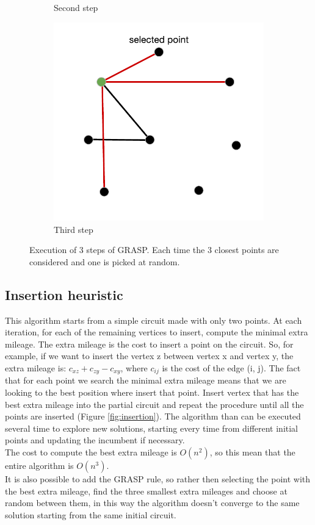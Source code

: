 \begin{figure}[h!]
\begin{subfigure}[b]{0.49\linewidth}
    \caption{Second step}
  \end{subfigure}
  \begin{subfigure}[b]{0.49\linewidth}
    \includegraphics[width=\linewidth]{media/grasp_fase3.pdf}
    \caption{Third step}
  \end{subfigure}
  \caption{Execution of 3 steps of GRASP. Each time the 3 closest points are considered and one is picked at random.}
\end{figure}

\subsection{Insertion heuristic}
This algorithm starts from a simple circuit made with only two points. At each iteration, for each of the remaining vertices to insert, compute the minimal extra mileage. The extra mileage is the cost to insert a point on the circuit. So, for example, if we want to insert the vertex z between vertex x and vertex y, the extra mileage is: $c_{xz} + c_{zy} - c_{xy}$, where $c_{ij}$ is the cost of the edge (i, j). The fact that for each point we search the minimal extra mileage means that we are looking to the best position where insert that point. Insert vertex that has the best extra mileage into the partial circuit and repeat the procedure until all the points are inserted (Figure \ref{fig:insertion}). The algorithm than can be executed several time to explore new solutions, starting every time from different initial points and updating the incumbent if necessary. \\
The cost to compute the best extra mileage is $O(n^2)$, so this mean that the entire algorithm is $O(n^3)$.\\
It is also possible to add the GRASP rule, so rather then selecting the point with the best extra mileage, find the three smallest extra mileages and choose at random between them, in this way the algorithm doesn't converge to the same solution starting from the same initial circuit. \\

